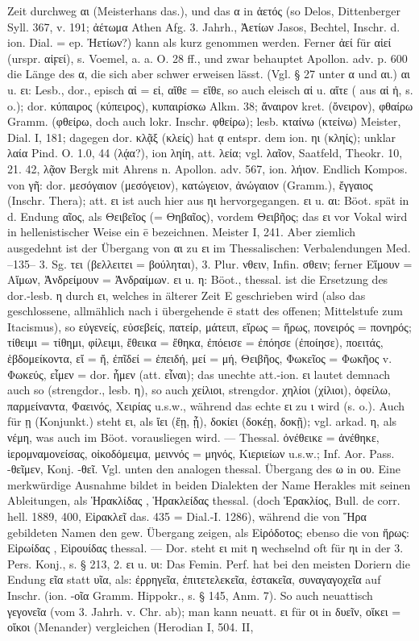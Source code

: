 Zeit durchweg αι (Meisterhans das.), und das α in ἀετός (so Delos, Dittenberger Syll. 367, v. 191; ἀέτωμα Athen Afg. 3. Jahrh., Ἀετίων Jasos, Bechtel, Inschr. d. ion. Dial. = ep. Ἠετίων?) kann als kurz genommen werden. Ferner ἀεί für αἰεί (urspr. αἰϝεί), s. Voemel, a. a. O. 28 ff., und zwar behauptet Apollon. adv. p. 600 die Länge des α, die sich aber schwer erweisen lässt. (Vgl. § 27 unter α und αι.) αι u. ει: Lesb., dor., episch αἰ = εἰ, αἴθε = εἴθε, so auch eleisch αἰ u. αἴτε ( aus αἰ ἠ, s. o.); dor. κύπαιρος (κύπειρος), κυπαιρίσκω Alkm. 38; ἄναιρον kret. (ὄνειρον), φθαίρω Gramm. (φθείρω, doch auch lokr. Inschr. φθείρω); lesb. κταίνω (κτείνω) Meister, Dial. I, 181; dagegen dor. κλᾷξ (κλείς) hat ᾳ entspr. dem ion. ηι (κληίς); unklar λαία Pind. O. 1.0, 44 (λᾴα?), ion ληίη, att. λεία; vgl. λαῖον, Saatfeld, Theokr. 10, 21. 42, λᾷον Bergk mit Ahrens n. Apollon. adv. 567, ion. λήιον. Endlich Kompos. von γῆ: dor. μεσόγαιον (μεσόγειον), κατώγειον, ἀνώγαιον (Gramm.), ἔγγαιος (Inschr. Thera); att. ει ist auch hier aus ηι hervorgegangen. ει u. αι: Böot. spät in d. Endung αῖος, als Θειβεῖος (= Θηβαῖος), vordem Θειβῆος; das ει vor Vokal wird in hellenistischer Weise ein ē bezeichnen. Meister I, 241. Aber ziemlich ausgedehnt ist der Übergang von αι zu ει im Thessalischen: Verbalendungen Med. --135-- 3. Sg. τει (βελλειτει = βούληται), 3. Plur. νθειν, Infin. σθειν; ferner Εἵμουν = Αἵμων, Ἀνδρείμουν = Ἀνδραίμων. ει u. η: Böot., thessal. ist die Ersetzung des dor.-lesb. η durch ει, welches in älterer Zeit E geschrieben wird (also das geschlossene, allmählich nach i übergehende ē statt des offenen; Mittelstufe zum Itacismus), so  εὐγενείς, εὐσεβείς, πατείρ, μάτειπ, εἵρως = ἥρως, πονειρός = πονηρός; τίθειμι = τίθημι, φίλειμι, ἔθεικα = ἔθηκα, ἐπόεισε = ἐπόησε (ἐποίησε), ποειτάς, ἑβδομείκοντα, εἴ = ἤ, ἐπῖδεί = ἐπειδή, μεί = μή, Θειβῆος, Φωκεῖος = Φωκῆος v. Φωκεύς, εἶμεν = dor. ἦμεν (att. εἶναι); das unechte att.-ion. ει lautet demnach auch  so (strengdor., lesb. η), so auch χείλιοι, strengdor. χηλίοι (χίλιοι), ὀφείλω, παρμείναντα, Φαεινός, Χειρίας u.s.w., während das echte ει  zu ι wird (s. o.). Auch für ῃ (Konjunkt.) steht  ει, als ἴει (ἔῃ, ᾖ), δοκίει (δοκέῃ, δοκῇ); vgl. arkad. η, als νέμη, was auch im Böot. vorausliegen wird. — Thessal. ὀνέθεικε = ἀνέθηκε, ἱερομναμονείσας, οἰκοδόμειμα, μειννός = μηνός, Κιεριείων u.s.w.; Inf. Aor. Pass. -θεῖμεν, Konj. -θεῖ. Vgl. unten den analogen thessal. Übergang des ω in ου. Eine merkwürdige Ausnahme bildet in beiden Dialekten der Name Herakles mit seinen Ableitungen, als Ἡρακλίδας , Ἡρακλείδας thessal. (doch Ἑρακλίος, Bull. de corr. hell. 1889, 400, Εἱρακλεῖ das. 435 = Dial.-I. 1286), während die von Ἥρα gebildeten Namen den gew. Übergang zeigen, als Εἱρόδοτος; ebenso die von ἥρως: Εἱρωίδας , Εἱρουίδας thessal. — Dor. steht ει mit η wechselnd oft für ηι in der 3. Pers. Konj., s. § 213, 2. ει u. υι: Das Femin. Perf. hat bei den meisten Doriern die Endung εῖα statt υῖα, als: ἐρρηγεῖα, ἐπιτετελεκεῖα, ἑστακεῖα, συναγαγοχεῖα auf Inschr. (ion. -οῖα Gramm. Hippokr., s. § 145, Anm. 7). So auch neuattisch γεγονεῖα (vom 3. Jahrh. v. Chr. ab); man kann neuatt. ει für οι in δυεῖν, οἴκει = οἴκοι (Menander) vergleichen (Herodian I, 504. II, 